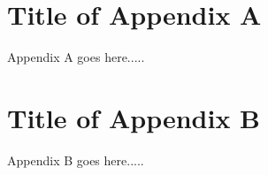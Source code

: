 \documentclass{standalone}
\begin{document}
\chapter{Title of Appendix A}
Appendix A goes here.....

\chapter{Title of Appendix B}
Appendix B goes here.....
\end{document}
